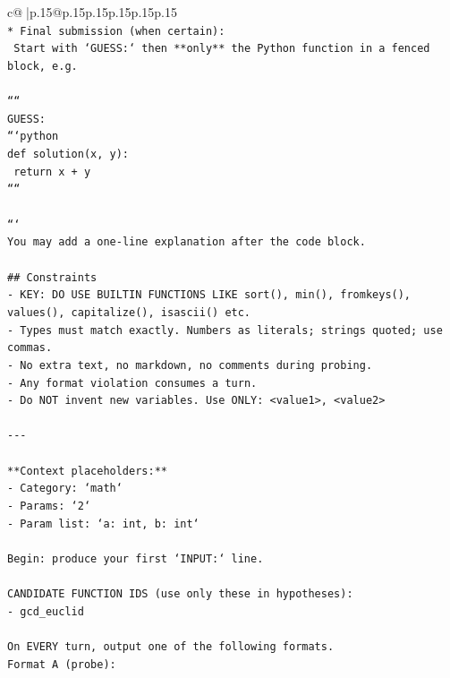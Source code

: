 \documentclass{article}
\begin{document}
{\begin{supertabular}{c@{$\;$}|p{.15\linewidth}@{}p{.15\linewidth}p{.15\linewidth}p{.15\linewidth}p{.15\linewidth}p{.15\linewidth}}
{{{\\ 
\texttt{* Final submission (when certain):} \\
\texttt{  Start with `GUESS:` then **only** the Python function in a fenced block, e.g.} \\
\\ 
\texttt{````} \\
\texttt{GUESS:} \\
\texttt{```python} \\
\texttt{def solution(x, y):} \\
\texttt{    return x + y} \\
\texttt{````} \\
\\ 
\texttt{```} \\
\texttt{You may add a one{-}line explanation after the code block.} \\
\\ 
\texttt{\#\# Constraints} \\
\texttt{{-} KEY: DO USE BUILTIN FUNCTIONS LIKE sort(), min(), fromkeys(), values(), capitalize(), isascii() etc.} \\
\texttt{{-} Types must match exactly. Numbers as literals; strings quoted; use commas.} \\
\texttt{{-} No extra text, no markdown, no comments during probing.} \\
\texttt{{-} Any format violation consumes a turn.} \\
\texttt{{-} Do NOT invent new variables. Use ONLY: <value1>, <value2>} \\
\\ 
\texttt{{-}{-}{-}} \\
\\ 
\texttt{**Context placeholders:**} \\
\texttt{{-} Category: `math`} \\
\texttt{{-} Params: `2`} \\
\texttt{{-} Param list: `a: int, b: int`} \\
\\ 
\texttt{Begin: produce your first `INPUT:` line.} \\
\\ 
\texttt{CANDIDATE FUNCTION IDS (use only these in hypotheses):} \\
\texttt{{-} gcd\_euclid} \\
\\ 
\texttt{On EVERY turn, output one of the following formats.} \\
\texttt{Format A (probe):} \\
}}}
\end{supertabular}}
\end{document}
